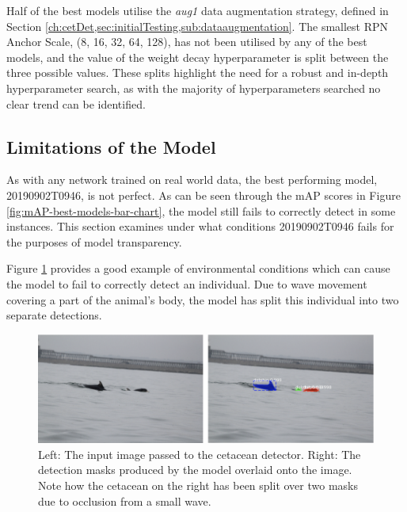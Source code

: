 Half of the best models utilise the \textit{aug1} data augmentation strategy, defined in Section \ref{ch:cetDet,sec:initialTesting,sub:dataaugmentation}. The smallest RPN Anchor Scale, (8, 16, 32, 64, 128), has not been utilised by any of the best models, and the value of the weight decay hyperparameter is split between the three possible values. These splits highlight the need for a robust and in-depth hyperparameter search, as with the majority of hyperparameters searched no clear trend can be identified.

\subsection{Limitations of the Model}\label{ch:cetDet,sec:ModelSelection,sub:LimitationsOfBest}

As with any network trained on real world data, the best performing model, 20190902T0946, is not perfect. As can be seen through the mAP scores in Figure \ref{fig:mAP-best-models-bar-chart}, the model still fails to correctly detect in some instances. This section examines under what conditions 20190902T0946 fails for the purposes of model transparency. 

Figure \ref{fig:model-fail-bad-detection-and-split-individual} provides a good example of environmental conditions which can cause the model to fail to correctly detect an individual. Due to wave movement covering a part of the animal's body, the model has split this individual into two separate detections.

\begin{figure}[h]
	\begin{center}
		\includegraphics[scale=0.6]{Chapter3/figs/model-fail-split-individual.png}
	\end{center}
	\caption[Left: The input image passed to the cetacean detector. Right: The detection masks produced by the model overlaid onto the image.]{Left: The input image passed to the cetacean detector. Right: The detection masks produced by the model overlaid onto the image. Note how the cetacean on the right has been split over two masks due to occlusion from a small wave.}
	\label{fig:model-fail-bad-detection-and-split-individual}
\end{figure}
 
